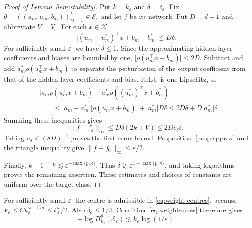 \documentclass[11pt,a4paper]{article}
\theoremstyle{remark}
\newcommand{\Xcal}{\mathcal X}
\newcommand{\norm}[1]{\lVert#1\rVert}
\newcommand{\abs}[1]{\lvert#1\rvert}
\begin{document}
\begingroup
\begin{proof}[Proof of Lemma~\ref{lem:stability}]
Put $k=k_\varepsilon$ and $\delta=\delta_\varepsilon$.
Fix $\theta=((a_m,u_m,b_m))_{m=1}^k\in\mathcal E_\varepsilon$
and let $f$ be its network. Put $D=d+1$ and abbreviate
$V=V_\varepsilon$. For each $x\in\Xcal$,
\[
\abs{(u_m-u_m^*)^\top x+b_m-b_m^*}\leq D\delta.
\]
For sufficiently small $\varepsilon$, we have $\delta\leq1$.
Since the approximating {hidden-layer coefficients and biases} are bounded by one,
$\abs{\rho(u_m^\top x+b_m)}\leq2D$.
Subtract and add $a_m^*\rho(u_m^\top x+b_m)$ to separate
the perturbation of the output coefficient from that of the hidden-layer
coefficients and bias. ReLU is
one-Lipschitz, so
\begin{align*}
&\abs{a_m\rho(u_m^\top x+b_m)
-a_m^*\rho((u_m^*)^\top x+b_m^*)}\\
&\qquad\leq
\abs{a_m-a_m^*}\abs{\rho(u_m^\top x+b_m)}
+\abs{a_m^*}D\delta
\leq2D\delta+D\abs{a_m^*}\delta.
\end{align*}
Summing these inequalities gives
\[
\norm{f-f_\varepsilon}_\infty
\leq D\delta(2k+V)
\leq2Dc_\delta\varepsilon.
\]
Taking $c_\delta\leq(8D)^{-1}$ proves the first error bound.
Proposition~\ref{prop:approx} and the triangle inequality give
$\norm{f-f_0}_\infty\leq\varepsilon/2$.

Finally, $k+1+V\lesssim\varepsilon^{-\max\{p,\kappa\}}$.
Thus $\delta\gtrsim\varepsilon^{1+\max\{p,\kappa\}}$, and taking
logarithms proves the remaining assertion. These estimates and
choices of constants are uniform over the target class.
\end{proof}
\endgroup

For sufficiently small $\varepsilon$, the centre is admissible in
\eqref{eq:weight-centres}, because
$V_\varepsilon\leq Ck_\varepsilon^{\omega-\beta/d}
\leq k_\varepsilon^\omega/2$. Also
$\delta_\varepsilon\leq1/2$. Condition~\eqref{eq:weight-mass}
therefore gives
\begin{equation}\label{eq:mass-bound}
-\log\Pi_{k_\varepsilon}^{\theta}(\mathcal E_\varepsilon)
\lesssim k_\varepsilon\log(1/\varepsilon).
\end{equation}
\end{document}
